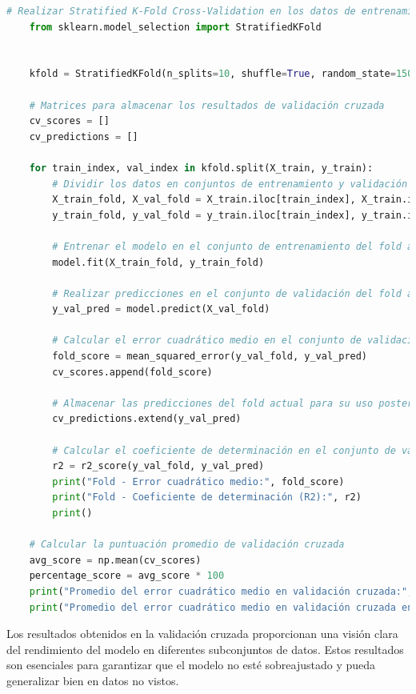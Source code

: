 \begin{lstlisting}[language=Python, caption=Realizar Stratified K-Fold Cross-Validation en los datos de entrenamiento, label=lst:skfold_train]
    # Realizar Stratified K-Fold Cross-Validation en los datos de entrenamiento
    from sklearn.model_selection import StratifiedKFold
    
    
    kfold = StratifiedKFold(n_splits=10, shuffle=True, random_state=1502)
    
    # Matrices para almacenar los resultados de validación cruzada
    cv_scores = []
    cv_predictions = []
    
    for train_index, val_index in kfold.split(X_train, y_train):
        # Dividir los datos en conjuntos de entrenamiento y validación
        X_train_fold, X_val_fold = X_train.iloc[train_index], X_train.iloc[val_index]
        y_train_fold, y_val_fold = y_train.iloc[train_index], y_train.iloc[val_index]
        
        # Entrenar el modelo en el conjunto de entrenamiento del fold actual
        model.fit(X_train_fold, y_train_fold)
    
        # Realizar predicciones en el conjunto de validación del fold actual
        y_val_pred = model.predict(X_val_fold)
    
        # Calcular el error cuadrático medio en el conjunto de validación del fold actual
        fold_score = mean_squared_error(y_val_fold, y_val_pred)
        cv_scores.append(fold_score)
    
        # Almacenar las predicciones del fold actual para su uso posterior
        cv_predictions.extend(y_val_pred)
    
        # Calcular el coeficiente de determinación en el conjunto de validación del fold actual
        r2 = r2_score(y_val_fold, y_val_pred)
        print("Fold - Error cuadrático medio:", fold_score)
        print("Fold - Coeficiente de determinación (R2):", r2)
        print()
    
    # Calcular la puntuación promedio de validación cruzada
    avg_score = np.mean(cv_scores)
    percentage_score = avg_score * 100
    print("Promedio del error cuadrático medio en validación cruzada:", avg_score)
    print("Promedio del error cuadrático medio en validación cruzada en %:", percentage_score)
\end{lstlisting}


Los resultados obtenidos en la validación cruzada proporcionan una visión clara del rendimiento del modelo en diferentes subconjuntos de datos. Estos resultados son esenciales para garantizar que el modelo no esté sobreajustado y pueda generalizar bien en datos no vistos.


